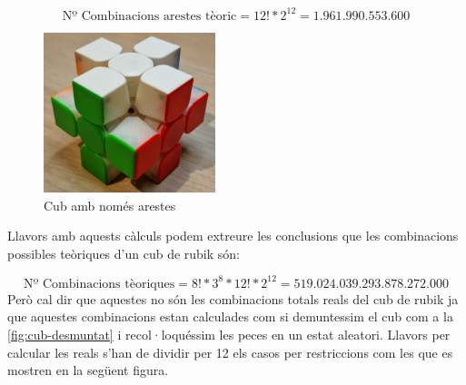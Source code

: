 $$ \textrm{Nº Combinacions arestes tèoric} = 12!*2^12 = 1.961.990.553.600$$

\begin{figure}[ht]
    \centering
    \includegraphics[width=5cm]{img/figures/only-edges.jpg}
    \caption{Cub amb només arestes}
    \label{fig:only-edges}
\end{figure}
Llavors amb aquests càlculs podem extreure les conclusions que les combinacions possibles teòriques d'un cub de rubik són:

$$ \textrm{Nº Combinacions tèoriques} = 8!*3^8*12!*2^{12}= 519.024.039.293.878.272.000 $$
\newpage Però cal dir que aquestes no són les combinacions totals reals del cub de rubik ja que aquestes combinacions estan calculades com si demuntessim el cub com a la \ref{fig:cub-desmuntat} i recol·loquéssim les peces en un estat aleatori.
Llavors per calcular les reals s'han de dividir per 12 els casos per restriccions com les que es mostren en la següent figura.

